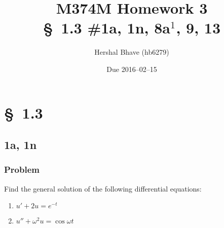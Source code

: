 \documentclass[12pt]{article}
\title{M374M Homework 3 \\
  \normalsize{\S~1.3 \#1a, 1n, 8a$^1$, 9, 13}}
\author{Hershal Bhave (hb6279)}
\date{Due 2016--02--15}
\begin{document}
\maketitle

\section{\S~1.3}
\subsection{1a, 1n}
\subsubsection*{Problem}
Find the general solution of the following differential equations:
\begin{enumerate}
\item $u'+2u=e^{-t}$
\item $u''+\omega^2u=\cos\omega t$
\end{enumerate}
\end{document}
